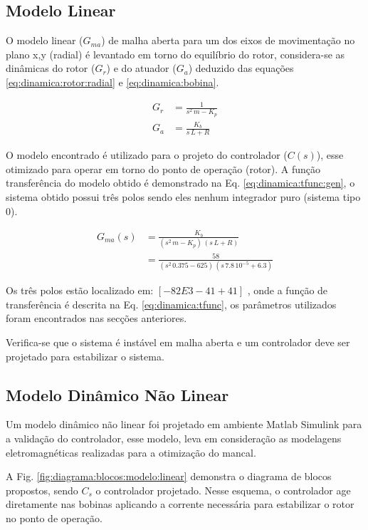 \subsection{Modelo Linear}

O modelo linear ($G_{ma}$) de malha aberta para um dos eixos de movimentação no plano x,y (radial) é levantado em torno do equilíbrio do rotor, considera-se as dinâmicas do rotor ($G_r$) e do atuador ($G_a$) deduzido das equações  \eqref{eq:dinamica:rotor:radial} e \eqref{eq:dinamica:bobina}.

\begin{align}
	G_r &= \frac{1}{s^2 \, m - K_p} \\
	G_a &= \frac{K_b}{s\, L + R}
\end{align}

O modelo encontrado é utilizado para o projeto do controlador ($C(s)$), esse otimizado para operar em torno do ponto de operação (rotor). A função transferência do modelo obtido é demonstrado na Eq. \eqref{eq:dinamica:tfunc:gen}, o sistema obtido possui três polos sendo eles nenhum integrador puro (sistema tipo 0).  

\begin{align}
	G_{ma}(s) &= \frac{K_b}{(s^2 \, m - K_p) \, (s\, L + R)}	\label{eq:dinamica:tfunc:gen} \\
	&= \frac{58}{(s^2 \, 0.375 - 625) \, (s\, 7.8 \, 10^{-5} + 6.3)}
	 \label{eq:dinamica:tfunc}
\end{align}
 

Os três polos estão localizado em: $[-82E3 -41 +41]	$ , onde a função de transferência é descrita na Eq. \eqref{eq:dinamica:tfunc}, os parâmetros utilizados foram encontrados nas secções anteriores. 

Verifica-se que o sistema é instável em malha aberta e um controlador deve ser projetado para estabilizar o sistema. 

\subsection{Modelo Dinâmico Não Linear}

Um modelo dinâmico não linear foi projetado em ambiente Matlab Simulink para a validação do controlador, esse modelo, leva em consideração as modelagens eletromagnéticas realizadas para a otimização do mancal.

A Fig. \ref{fig:diagrama:blocos:modelo:linear} demonstra o diagrama de blocos propostos, sendo $C_s$ o controlador projetado. Nesse esquema, o controlador age diretamente nas bobinas aplicando a corrente necessária para estabilizar o rotor no ponto de operação. 

